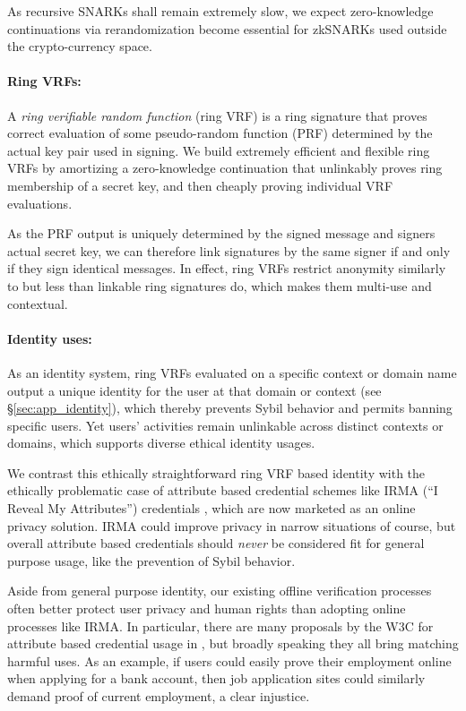 As recursive SNARKs shall remain extremely slow,
we expect zero-knowledge continuations via rerandomization become
essential for zkSNARKs used outside the crypto-currency space.

\paragraph{Ring VRFs:}

A {\it ring verifiable random function} (ring VRF) is a ring signature
that proves correct evaluation of some pseudo-random function (PRF)
determined by the actual key pair used in signing. %
We build extremely efficient and flexible ring VRFs by amortizing a
zero-knowledge continuation that unlinkably proves ring membership
of a secret key, and then cheaply proving individual VRF evaluations.

As the PRF output is uniquely determined by the signed message and
signers actual secret key, we can therefore link signatures by the
same signer if and only if they sign identical messages.
In effect, ring VRFs restrict anonymity similarly to but less than
 linkable ring signatures do, which makes them multi-use and contextual.

\paragraph{Identity uses:}

As an identity system, ring VRFs evaluated on a specific context or
domain name output a unique identity for the user at that domain or
context (see \S\ref{sec:app_identity}), which thereby prevents
Sybil behavior and permits banning specific users.
Yet users' activities remain unlinkable across distinct contexts or
domains, which supports diverse ethical identity usages.

We contrast this ethically straightforward ring VRF based identity
with the ethically problematic case of attribute based credential
schemes like IRMA (``I Reveal My Attributes'') credentials \cite{IRMAcredentials},
 which are now marketed as an online privacy solution.
IRMA could improve privacy in narrow situations of course, but
overall attribute based credentials should {\it never} be considered
fit for general purpose usage, like the prevention of Sybil behavior.

Aside from general purpose identity, our existing offline
verification processes often better protect user privacy and human
rights than adopting online processes like IRMA.
%
In particular, there are many proposals by the W3C for attribute based
credential usage in \cite{w3c_vc_use_cases}, but broadly speaking they
all bring matching harmful uses.  %
As an example, if users could easily prove their employment online when
applying for a bank account, then job application sites could similarly
demand proof of current employment, a clear injustice.

